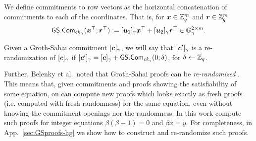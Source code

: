 We define commitments to row vectors as the horizontal concatenation of commitments to each of the coordinates. That is, for ${\boldsymbol{x}}\in\mathbb{Z}_q^m$ and ${\boldsymbol{r}}\in\mathbb{Z}_q^m$
\begin{align*}
{\mathsf{GS}}.\mathsf{Com}_{ck_\gamma}({\boldsymbol{x}}^\top;{\boldsymbol{r}}^\top) := [{\boldsymbol{u}}_1]_\gamma{\boldsymbol{x}}^\top+[{\boldsymbol{u}}_2]_\gamma{\boldsymbol{r}}^\top\in\mathbb{G}_\gamma^{2\times m}.
\end{align*}

Given a Groth-Sahai commitment $[{\boldsymbol{c}}]_\gamma$, we will say that $[{\boldsymbol{c}}']_\gamma$ is a re-randomization of $[{\boldsymbol{c}}]_\gamma$ if $[{\boldsymbol{c}}']_\gamma = [{\boldsymbol{c}}]_\gamma + {\mathsf{GS}}.\mathsf{Com}_{ck_s}(0;\delta)$, for $\delta\gets\mathbb{Z}_q$.

Further, Belenky et al.~noted that Groth-Sahai proofs can be \emph{re-randomized} \cite{C:BCCKLS09}. This means that, given commitments and proofs showing the satisfiability of some equation, on can compute new proofs which looks exactly as fresh proofs (i.e. computed with fresh randomness) for the same equation, even without knowing the commitment openings nor the randomness. In this work compute such proofs for integer equations $\beta(\beta-1)=0$ and $\beta x = y$. For completeness, in App.~\ref{sec:GSproofs-hg} we show how to construct and re-randomize such proofs.
